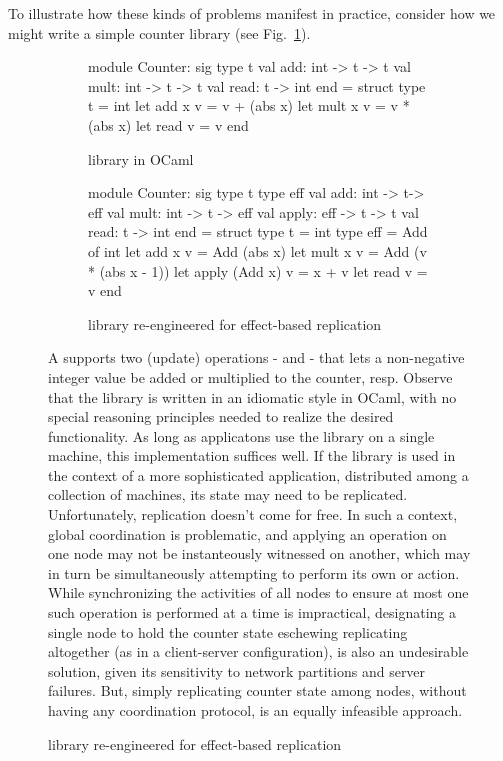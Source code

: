 To illustrate how these kinds of problems manifest in practice,
consider how we might write a simple counter library (see
Fig.~\ref{fig:counter-adt}).
\begin{figure}
\begin{subfigure}[b]{0.4\textwidth}
  \begin{ocaml}
    module Counter: sig
      type t
      val add: int -> t -> t
      val mult: int -> t -> t
      val read: t -> int
    end = struct
      type t = int
      let add x v = v + (abs x)
      let mult x v = v * (abs x)
      let read v = v
    end
  \end{ocaml}

\caption{ library in OCaml}
\label{fig:counter-adt}
\end{subfigure}
\begin{subfigure}[b]{0.56\textwidth}
  \begin{ocaml}
    module Counter: sig
      type t
      type eff
      val add: int -> t-> eff
      val mult: int -> t -> eff
      val apply: eff -> t -> t
      val read: t -> int
    end = struct
      type t = int
      type eff = Add of int
      let add x v = Add (abs x)
      let mult x v = Add (v * (abs x - 1))
      let apply (Add x) v = x + v
      let read v = v
    end
  \end{ocaml}
\caption{ library re-engineered for effect-based replication}
\label{fig:counter-rdt}
\end{subfigure}
A  supports two (update) operations -  and 
- that lets a non-negative integer value be added or multiplied to the
counter, resp.  Observe that the library is written in an idiomatic
style in OCaml, with no special reasoning principles needed to realize
the desired functionality.  As long as applicatons use the library on
a single machine, this implementation suffices well.  If the library
is used in the context of a more sophisticated application,
distributed among a collection of machines, its state may need to be
replicated.  Unfortunately, replication doesn't come for free.  In
such a context, global coordination is problematic, and applying an
 operation on one node may not be instanteously witnessed on
another, which may in turn be simultaneously attempting to perform its
own  or  action.  While synchronizing the activities of
all nodes to ensure at most one such operation is performed at a time
is impractical, designating a single node to hold the counter state
eschewing replicating altogether (as in a client-server
configuration), is also an undesirable solution, given its sensitivity
to network partitions and server failures.  But, simply replicating
counter state among nodes, without having any coordination protocol,
is an equally infeasible approach.


\end{figure}
